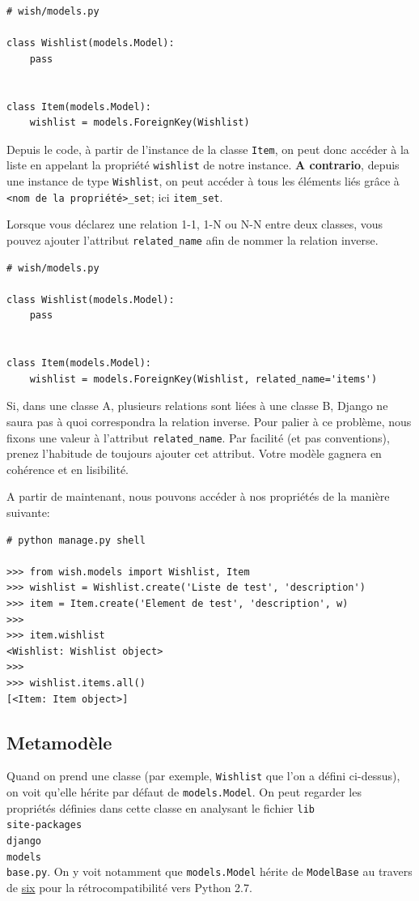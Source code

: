 \documentclass[11pt]{amsbook}
\begin{document}
\begin{verbatim}
# wish/models.py

class Wishlist(models.Model):
    pass


class Item(models.Model):
    wishlist = models.ForeignKey(Wishlist)
\end{verbatim}

Depuis le code, à partir de l’instance de la classe \texttt{Item}, on peut donc accéder à la liste en appelant la propriété \texttt{wishlist} de notre instance. \textbf{A contrario}, depuis une instance de type \texttt{Wishlist}, on peut accéder à tous les éléments liés grâce à \texttt{<nom de la propriété>\_set}; ici \texttt{item\_set}.


Lorsque vous déclarez une relation 1-1, 1-N ou N-N entre deux classes, vous pouvez ajouter l’attribut \texttt{related\_name} afin de nommer la relation inverse.


\begin{verbatim}
# wish/models.py

class Wishlist(models.Model):
    pass


class Item(models.Model):
    wishlist = models.ForeignKey(Wishlist, related_name='items')
\end{verbatim}

Si, dans une classe A, plusieurs relations sont liées à une classe B, Django ne saura pas à quoi correspondra la relation inverse. Pour palier à ce problème, nous fixons une valeur à l’attribut \texttt{related\_name}. Par facilité (et pas conventions), prenez l’habitude de toujours ajouter cet attribut. Votre modèle gagnera en cohérence et en lisibilité.

A partir de maintenant, nous pouvons accéder à nos propriétés de la manière suivante:


\begin{verbatim}
# python manage.py shell

>>> from wish.models import Wishlist, Item
>>> wishlist = Wishlist.create('Liste de test', 'description')
>>> item = Item.create('Element de test', 'description', w)
>>>
>>> item.wishlist
<Wishlist: Wishlist object>
>>>
>>> wishlist.items.all()
[<Item: Item object>]
\end{verbatim}

\hypertarget{x-metamodèle}{\subsection{Metamodèle}}
Quand on prend une classe (par exemple, \texttt{Wishlist} que l’on a défini ci-dessus), on voit qu’elle hérite par défaut de \texttt{models.Model}. On peut regarder les propriétés définies dans cette classe en analysant le fichier \texttt{lib\\site-packages\\django\\models\\base.py}. On y voit notamment que \texttt{models.Model} hérite de \texttt{ModelBase} au travers de \href{https://pypi.python.org/pypi/six}{six} pour la rétrocompatibilité vers Python 2.7.
\end{document}
